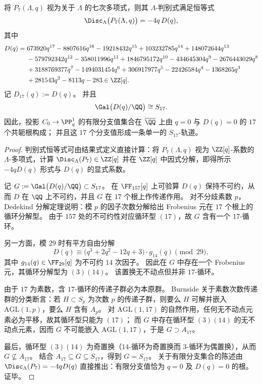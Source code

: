 \begin{theorem}\label{thm:real-input-40-p7-discriminant-branch-s17}
将 \(P_7(\Lambda,q)\) 视为关于 \(\Lambda\) 的七次多项式，则其 \(\Lambda\)-判别式满足恒等式
\[
\Disc_{\Lambda}\bigl(P_7(\Lambda,q)\bigr)=-4q\,D(q),
\]
其中
\[
\begin{aligned}
D(q)=\;&673920q^{17}-8807616q^{16}-19218432q^{15}+103232785q^{14}+148072644q^{13}\\
&-579792342q^{12}-358011996q^{11}+1846795172q^{10}-434645304q^{9}-2676443029q^{8}\\
&+3188769377q^{7}-1494031454q^{6}+306917977q^{5}-22426584q^{4}-1368265q^{3}\\
&+281543q^{2}-8113q-283\in\ZZ[q].
\end{aligned}
\]
记 \(D_{17}(q):=D(q)\)。
并且
\[
\Gal\bigl(D(q)/\QQ\bigr)\cong S_{17}.
\]
因此，投影 \(C_0\to\PP^1_q\) 的有限分支值集合在 \(\overline{\QQ}\) 上由 \(q=0\) 与 \(D(q)=0\) 的 \(17\) 个共轭根构成；
并且这 \(17\) 个分支值形成一条单一的 \(S_{17}\)-轨道。
\end{theorem}
\begin{proof}
判别式恒等式可由结果式定义直接计算：将 \(P_7(\Lambda,q)\) 视为 \(\ZZ[q]\)-系数的 \(\Lambda\)-多项式，计算 \(\Disc_{\Lambda}(P_7)\in\ZZ[q]\) 并在 \(\ZZ[q]\) 中因式分解，即得所示 \(-4qD(q)\) 形式与 \(D(q)\) 的显式系数。
\par
记
\(
G:=\Gal\bigl(D(q)/\QQ\bigr)\subset S_{17}
\)。
在 \(\FF_{157}[q]\) 上可验算 \(D(q)\) 保持不可约，从而 \(D\) 在 \(\QQ\) 上不可约，并且 \(G\) 在 \(17\) 个根上作传递作用。
对不分歧素数 \(p\)，Dedekind 分解定理说明：模 \(p\) 的因子次数分解给出 Frobenius 元在 \(17\) 个根上的循环分解型。
由于 \(157\) 处的不可约性对应循环型 \((17)\)，故 \(G\) 含有一个 \(17\)-循环。
\par
另一方面，模 \(29\) 时有平方自由分解
\[
D(q)\equiv \bigl(q^3+2q^2-12q+3\bigr)\cdot g_{14}(q)\pmod{29},
\]
其中 \(g_{14}(q)\in\FF_{29}[q]\) 为不可约 \(14\) 次因子。
因此在 \(G\) 中存在一个 Frobenius 元，其循环分解型为 \((3)(14)\)。
该置换无不动点但并非 \(17\)-循环。
\par
由于 \(17\) 为素数，含 \(17\)-循环的传递子群必为本原群。
Burnside 关于素数次数传递群的分类断言：若 \(H\subset S_p\) 为次数 \(p\) 的传递子群，则要么 \(H\) 可解并嵌入 \(\mathrm{AGL}(1,p)\)，要么 \(H\) 含有 \(A_p\)。
对 \(\mathrm{AGL}(1,17)\) 的自然作用，任何无不动点元素必为平移，故其循环型只能为 \((17)\)；
而 \(G\) 中存在循环型 \((3)(14)\) 的无不动点元素，因而 \(G\) 不可能嵌入 \(\mathrm{AGL}(1,17)\)，于是 \(G\supset A_{17}\)。
\par
最后，循环型 \((3)(14)\) 为奇置换（\(14\)-循环为奇置换而 \(3\)-循环为偶置换），从而 \(G\nsubseteq A_{17}\)。
结合 \(A_{17}\subseteq G\subseteq S_{17}\)，得到 \(G=S_{17}\)。
关于有限分支集合的陈述由 \(\Disc_{\Lambda}(P_7)=-4qD(q)\) 直接推出：有限分支值恰为 \(q=0\) 及 \(D(q)=0\) 的根。证毕。
\end{proof}

